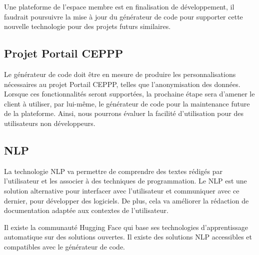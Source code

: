 Une plateforme de l'espace membre est en finalisation de développement, il faudrait poursuivre la mise à jour du générateur de code pour supporter cette nouvelle technologie pour des projets futurs similaires.


\subsection{Projet Portail CEPPP}

Le générateur de code doit être en mesure de produire les personnalisations nécessaires au projet Portail CEPPP, telles que l'anonymisation des données. Lorsque ces fonctionnalités seront supportées, la prochaine étape sera d'amener le client à utiliser, par lui-même, le générateur de code pour la maintenance future de la plateforme. Ainsi, nous pourrons évaluer la facilité d'utilisation pour des utilisateurs non développeurs.

\subsection{NLP}
La technologie NLP va permettre de comprendre des textes rédigés par l’utilisateur et les associer à des techniques de programmation. Le NLP est une solution alternative pour interfacer avec l’utilisateur et communiquer avec ce dernier, pour développer des logiciels. De plus, cela va améliorer la rédaction de documentation adaptée aux contextes de l'utilisateur. 

Il existe la communauté Hugging Face qui base ses technologies d'apprentissage automatique sur des solutions ouvertes. Il existe des solutions NLP accessibles et compatibles avec le générateur de code.





